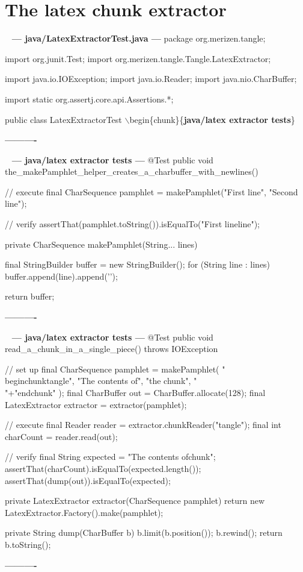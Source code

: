 \documentclass{book}
\newenvironment{chunk}[1]{%
{\ }\newline\noindent%
\hbox{\hskip 2.0cm}{\bf --- #1 ---}%
\verbatim}%                               say exactly what we see
{\endverbatim%
\par{}%
\noindent{}%
\hbox{\hskip 2.0cm}{\bf ----------}%
\par%
\normalsize\noindent}%
\providecommand{\getchunk}[1]{%
\noindent%
{\small $\backslash{}$begin\{chunk\}\{{\bf #1}\}}%
\index{{#1}}}
\begin{document}
\section{The latex chunk extractor}
\begin{chunk}{java/LatexExtractorTest.java}
package org.merizen.tangle;

import org.junit.Test;
import org.merizen.tangle.Tangle.LatexExtractor;

import java.io.IOException;
import java.io.Reader;
import java.nio.CharBuffer;

import static org.assertj.core.api.Assertions.*;

public class LatexExtractorTest {
\getchunk{java/latex extractor tests}
}
\end{chunk}

\begin{chunk}{java/latex extractor tests}
@Test
public void the_makePamphlet_helper_creates_a_charbuffer_with_newlines() {
    // execute
    final CharSequence pamphlet = makePamphlet("First line", "Second line");

    // verify
    assertThat(pamphlet.toString()).isEqualTo("First line\nSecond line\n");
}

private CharSequence makePamphlet(String... lines) {
    final StringBuilder buffer = new StringBuilder();
    for (String line : lines) {
        buffer.append(line).append('\n');
    }

    return buffer;
}
\end{chunk}

\begin{chunk}{java/latex extractor tests}
@Test
public void read_a_chunk_in_a_single_piece() throws IOException {
    // set up
    final CharSequence pamphlet = makePamphlet(
            "\\begin{chunk}{tangle}",
            "The contents of",
            "the chunk",
            "\\"+"end{chunk}"
    );
    final CharBuffer out = CharBuffer.allocate(128);
    final LatexExtractor extractor = extractor(pamphlet);

    // execute
    final Reader reader = extractor.chunkReader("tangle");
    final int charCount = reader.read(out);

    // verify
    final String expected = "The contents of\nthe chunk\n";
    assertThat(charCount).isEqualTo(expected.length());
    assertThat(dump(out)).isEqualTo(expected);
}

private LatexExtractor extractor(CharSequence pamphlet) {
    return new LatexExtractor.Factory().make(pamphlet);
}

private String dump(CharBuffer b) {
    b.limit(b.position());
    b.rewind();
    return b.toString();
}
\end{chunk}
\end{document}
